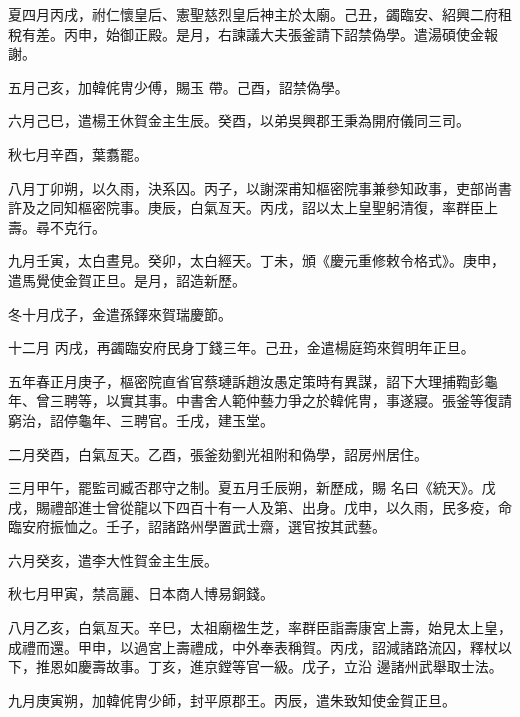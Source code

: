 \begin{pinyinscope}
 夏四月丙戌，祔仁懷皇后、憲聖慈烈皇后神主於太廟。己丑，蠲臨安、紹興二府租稅有差。丙申，始御正殿。是月，右諫議大夫張釜請下詔禁偽學。遣湯碩使金報謝。



 五月己亥，加韓侂冑少傅，賜玉
 帶。己酉，詔禁偽學。



 六月己巳，遣楊王休賀金主生辰。癸酉，以弟吳興郡王秉為開府儀同三司。



 秋七月辛酉，葉翥罷。



 八月丁卯朔，以久雨，決系囚。丙子，以謝深甫知樞密院事兼參知政事，吏部尚書許及之同知樞密院事。庚辰，白氣亙天。丙戌，詔以太上皇聖躬清復，率群臣上壽。尋不克行。



 九月壬寅，太白晝見。癸卯，太白經天。丁未，頒《慶元重修敕令格式》。庚申，遣馬覺使金賀正旦。是月，詔造新歷。



 冬十月戊子，金遣孫鐸來賀瑞慶節。



 十二月
 丙戌，再蠲臨安府民身丁錢三年。己丑，金遣楊庭筠來賀明年正旦。



 五年春正月庚子，樞密院直省官蔡璉訴趙汝愚定策時有異謀，詔下大理捕鞫彭龜年、曾三聘等，以實其事。中書舍人範仲藝力爭之於韓侂冑，事遂寢。張釜等復請窮治，詔停龜年、三聘官。壬戌，建玉堂。



 二月癸酉，白氣亙天。乙酉，張釜劾劉光祖附和偽學，詔房州居住。



 三月甲午，罷監司臧否郡守之制。夏五月壬辰朔，新歷成，賜
 名曰《統天》。戊戌，賜禮部進士曾從龍以下四百十有一人及第、出身。戊申，以久雨，民多疫，命臨安府振恤之。壬子，詔諸路州學置武士齋，選官按其武藝。



 六月癸亥，遣李大性賀金主生辰。



 秋七月甲寅，禁高麗、日本商人博易銅錢。



 八月乙亥，白氣亙天。辛巳，太祖廟楹生芝，率群臣詣壽康宮上壽，始見太上皇，成禮而還。甲申，以過宮上壽禮成，中外奉表稱賀。丙戌，詔減諸路流囚，釋杖以下，推恩如慶壽故事。丁亥，進京鏜等官一級。戊子，立沿
 邊諸州武舉取士法。



 九月庚寅朔，加韓侂冑少師，封平原郡王。丙辰，遣朱致知使金賀正旦。




\end{pinyinscope}
